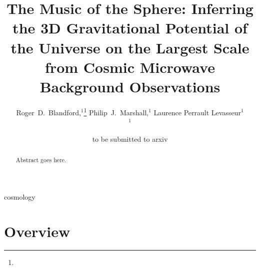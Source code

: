\documentclass[useAMS,usenatbib,a4paper]{mn2e}
\title[The 3D Potential of the Universe from CMB Data]
{The Music of the Sphere: Inferring the 3D Gravitational Potential of the Universe on the Largest Scale from Cosmic Microwave Background Observations}
\author[Blandford et al.]{%
    Roger~D.~Blandford,$^{1}$\thanks{\rdbemail}
    Philip~J.~Marshall,$^{1}$
    Laurence Perrault Levasseur$^{1}$
    \medskip\\
    $^1$\kipac
}
\begin{document}
\date{to be submitted to arxiv}
\pagerange{\pageref{firstpage}--\pageref{lastpage}}

\maketitle

\label{firstpage}


\begin{abstract}

Abstract goes here.

\end{abstract}


\begin{keywords}
  cosmology
\end{keywords}

\setcounter{footnote}{1}


\section{Overview}
\end{document}
